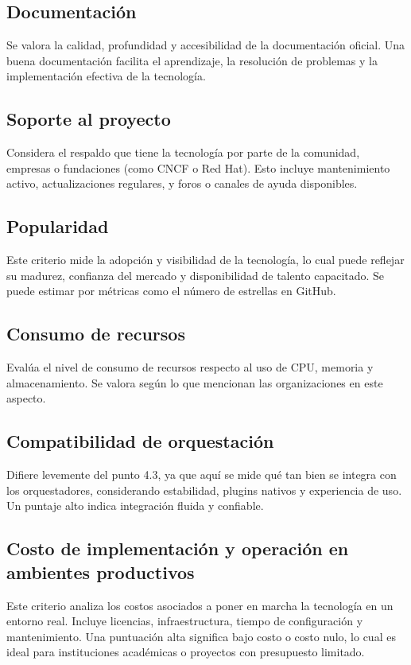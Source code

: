 \subsection{Documentación}
Se valora la calidad, profundidad y accesibilidad de la documentación oficial. Una buena documentación facilita el aprendizaje, la resolución de problemas y la implementación efectiva de la tecnología.

\subsection{Soporte al proyecto}
Considera el respaldo que tiene la tecnología por parte de la comunidad, empresas o fundaciones (como CNCF o Red Hat). Esto incluye mantenimiento activo, actualizaciones regulares, y foros o canales de ayuda disponibles.

\subsection{Popularidad}
Este criterio mide la adopción y visibilidad de la tecnología, lo cual puede reflejar su madurez, confianza del mercado y disponibilidad de talento capacitado. Se puede estimar por métricas como el número de estrellas en GitHub.

\subsection{Consumo de recursos}
Evalúa el nivel de consumo de recursos respecto al uso de CPU, memoria y almacenamiento. Se valora según lo que mencionan las organizaciones en este aspecto.

\subsection{Compatibilidad de orquestación}
Difiere levemente del punto 4.3, ya que aquí se mide qué tan bien se integra con los orquestadores, considerando estabilidad, plugins nativos y experiencia de uso. Un puntaje alto indica integración fluida y confiable.

\subsection{Costo de implementación y operación en ambientes productivos}
Este criterio analiza los costos asociados a poner en marcha la tecnología en un entorno real. Incluye licencias, infraestructura, tiempo de configuración y mantenimiento. Una puntuación alta significa bajo costo o costo nulo, lo cual es ideal para instituciones académicas o proyectos con presupuesto limitado.

